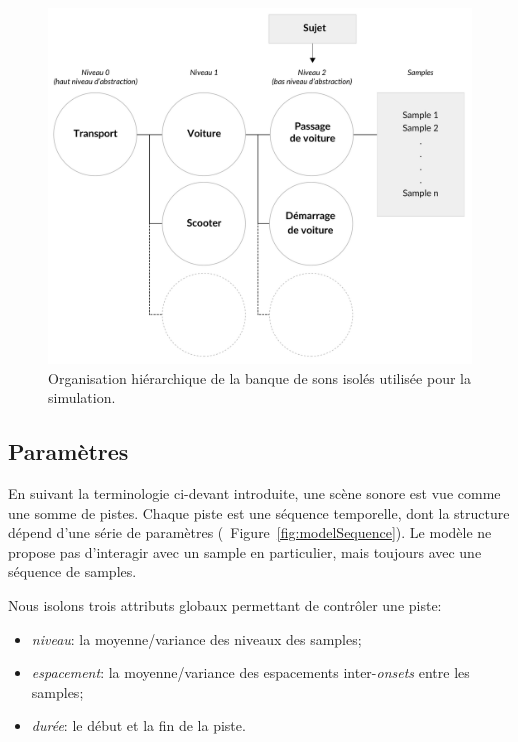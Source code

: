 \begin{figure}[t]
        \myfloatalign
        \includegraphics[width=.8\linewidth]{gfx/ch_4/3}
       \caption{Organisation hiérarchique de la banque de sons isolés utilisée pour la simulation. }\label{fig:orgDb}
\end{figure}

\subsection{Paramètres}
\label{sec:ch4_modelParam}

En suivant la terminologie ci-devant introduite, une scène sonore est vue comme une somme de pistes. Chaque piste est une séquence temporelle, dont la structure dépend d'une série de paramètres (\cf~Figure~\ref{fig:modelSequence}).  Le modèle ne propose pas d’interagir avec un sample en particulier, mais toujours avec une séquence de samples.

Nous isolons trois attributs globaux permettant de contrôler une piste:

\begin{itemize}
\item \emph{niveau}: la moyenne/variance des niveaux des samples;
\item \emph{espacement}: la moyenne/variance des espacements inter-\emph{onsets} entre les samples;
\item \emph{durée}: le début et la fin de la piste.
\end{itemize}

